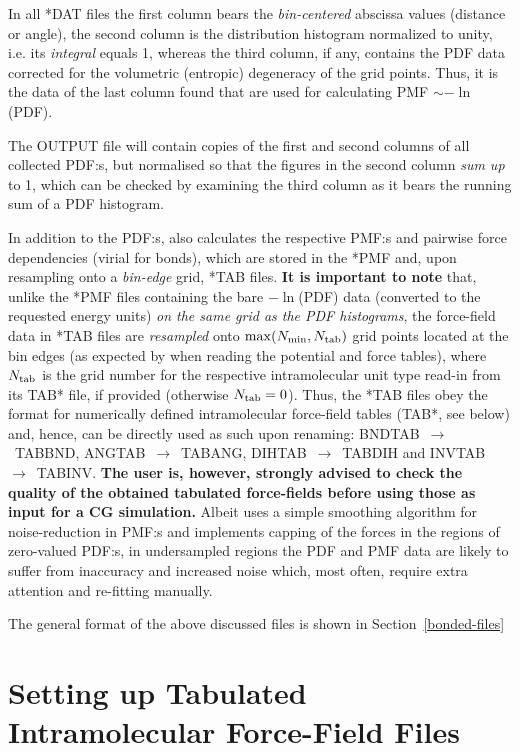 In all *DAT files the first column bears the {\em bin-centered}
abscissa values (distance or angle), the second column is the distribution
histogram normalized to unity, i.e. its {\em integral} equals 1, whereas
the third column, if any, contains the PDF data corrected for the volumetric
(entropic) degeneracy of the grid points.  Thus, it is the data of the last
column found that are used for calculating PMF $\sim -\ln$(PDF).

The OUTPUT file will contain copies of the first and second
columns of all collected PDF:s, but normalised so that the figures
in the second column {\em sum up} to 1, which can be checked
by examining the third column as it bears the running sum of
a PDF histogram.

In addition to the PDF:s, \D also calculates the respective PMF:s and
pairwise force dependencies (virial for bonds), which are stored in
the *PMF and, upon resampling onto a {\em bin-edge} grid, *TAB files.
{\bf It is important to note} that, unlike the *PMF files containing
the bare $-\ln$(PDF) data (converted to the requested energy units)
{\em on the same grid as the PDF histograms}, the force-field data in *TAB
files are {\em resampled} onto $\max(N_{\rm min},N_{\rm tab})$ grid points
located at the bin edges (as expected by \D when reading the potential
and force tables), where $N_{\rm tab}$ is the grid number for
the respective intramolecular unit type read-in from its TAB* file,
if provided (otherwise $N_{\rm tab}=0$). Thus, the *TAB files obey
the \D format for numerically defined intramolecular force-field tables
(TAB*, see below) and, hence, can be directly used as such upon renaming:
BNDTAB~$\to$~TABBND, ANGTAB~$\to$~TABANG, DIHTAB~$\to$~TABDIH and INVTAB~$\to$~TABINV.
{\bf The user is, however, strongly advised to check the quality
of the obtained tabulated force-fields before using those as input
for a CG simulation.}  Albeit \D uses a simple smoothing algorithm
for noise-reduction in PMF:s and implements capping of the forces
in the regions of zero-valued PDF:s, in undersampled regions the PDF
and PMF data are likely to suffer from inaccuracy and increased noise
which, most often, require extra attention and re-fitting manually.

The general format of the above discussed files is shown in Section~\ref{bonded-files}

\section{Setting up Tabulated Intramolecular Force-Field Files}
\label{bonded-tables}


